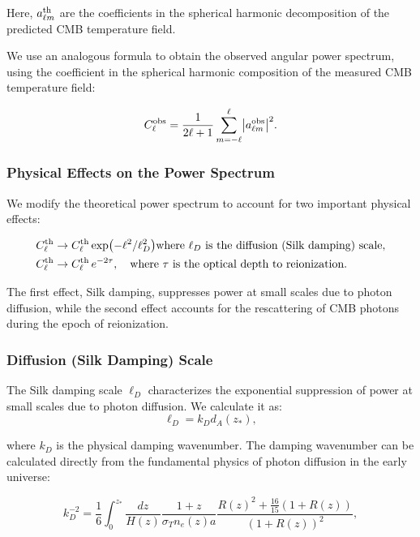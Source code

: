 \documentclass[11pt]{article}
\theoremstyle{definition}
\begin{document}
Here, $a_{\ell m}^{\rm th}$ are the coefficients in the spherical harmonic decomposition of the predicted CMB temperature field.

We use an analogous formula to obtain the observed angular power spectrum, using the coefficient in the spherical harmonic composition of the measured CMB temperature field:

\begin{equation}
  C_\ell^{\rm obs}
  = \frac{1}{2\ell+1}\sum_{m=-\ell}^{\ell}\bigl|a_{\ell m}^{\rm obs}\bigr|^2.
\end{equation}

\subsubsection{Physical Effects on the Power Spectrum}
We modify the theoretical power spectrum to account for two important physical effects:

\begin{align}
  &C_\ell^{\rm th} \to C_\ell^{\rm th}  \exp\bigl(-\ell^2/\ell_D^2\bigr)
  \text{where }\ell_D\text{ is the diffusion (Silk damping) scale},\\
  &C_\ell^{\rm th}\to C_\ell^{\rm th}\,e^{-2\tau},
  \quad
  \text{where }\tau\text{ is the optical depth to reionization}.
\end{align}

The first effect, Silk damping, suppresses power at small scales due to photon diffusion, while the second effect accounts for the rescattering of CMB photons during the epoch of reionization.

\subsubsection{Diffusion (Silk Damping) Scale}
The Silk damping scale $\ell_D$ characterizes the exponential suppression of power at small scales due to photon diffusion. We calculate it as:
\begin{equation}
\ell_D = k_D d_A(z_*),
\end{equation}

  where $k_D$ is the physical damping wavenumber. The damping wavenumber can be calculated directly from the fundamental physics of photon diffusion in the early universe:

\begin{equation}
k_D^{-2} = \frac{1}{6} \int_{0}^{z_*} \frac{dz}{H(z)} \frac{1+z}{\sigma_T n_e(z) a} \frac{{R(z)}^2 + \frac{16}{15}(1+R(z))}{(1+R(z))^2},
\end{equation}
\end{document}

